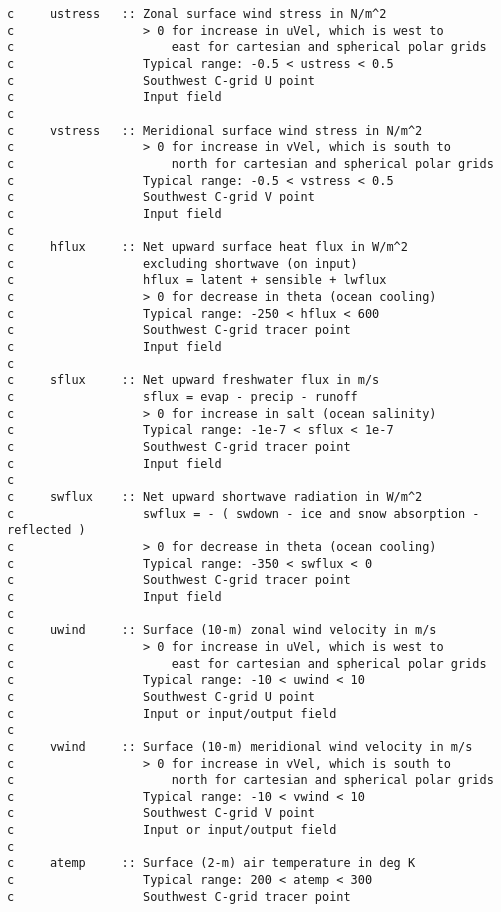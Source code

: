 {\footnotesize
\begin{verbatim}



c     ustress   :: Zonal surface wind stress in N/m^2
c                  > 0 for increase in uVel, which is west to
c                      east for cartesian and spherical polar grids
c                  Typical range: -0.5 < ustress < 0.5
c                  Southwest C-grid U point
c                  Input field
c
c     vstress   :: Meridional surface wind stress in N/m^2
c                  > 0 for increase in vVel, which is south to
c                      north for cartesian and spherical polar grids
c                  Typical range: -0.5 < vstress < 0.5
c                  Southwest C-grid V point
c                  Input field
c
c     hflux     :: Net upward surface heat flux in W/m^2 
c                  excluding shortwave (on input)
c                  hflux = latent + sensible + lwflux
c                  > 0 for decrease in theta (ocean cooling)
c                  Typical range: -250 < hflux < 600
c                  Southwest C-grid tracer point
c                  Input field
c
c     sflux     :: Net upward freshwater flux in m/s
c                  sflux = evap - precip - runoff
c                  > 0 for increase in salt (ocean salinity)
c                  Typical range: -1e-7 < sflux < 1e-7
c                  Southwest C-grid tracer point
c                  Input field
c
c     swflux    :: Net upward shortwave radiation in W/m^2
c                  swflux = - ( swdown - ice and snow absorption - reflected )
c                  > 0 for decrease in theta (ocean cooling)
c                  Typical range: -350 < swflux < 0
c                  Southwest C-grid tracer point
c                  Input field
c
c     uwind     :: Surface (10-m) zonal wind velocity in m/s
c                  > 0 for increase in uVel, which is west to
c                      east for cartesian and spherical polar grids
c                  Typical range: -10 < uwind < 10
c                  Southwest C-grid U point
c                  Input or input/output field
c
c     vwind     :: Surface (10-m) meridional wind velocity in m/s
c                  > 0 for increase in vVel, which is south to
c                      north for cartesian and spherical polar grids
c                  Typical range: -10 < vwind < 10
c                  Southwest C-grid V point
c                  Input or input/output field
c
c     atemp     :: Surface (2-m) air temperature in deg K
c                  Typical range: 200 < atemp < 300
c                  Southwest C-grid tracer point

\end{verbatim}}
